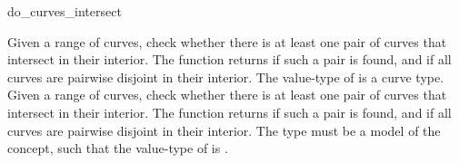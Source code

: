 \ccRefPageBegin

\begin{ccRefFunction}{do_curves_intersect}


{Given a range of curves, check whether there is at least one pair of curves
 that intersect in their interior. The function returns  if such
 a pair is found, and  if all curves are pairwise disjoint in
 their interior. The value-type of  is a curve type.}
\ccGlue
{}
{Given a range of curves, check whether there is at least one pair of curves
 that intersect in their interior. The function returns  if such
 a pair is found, and  if all curves are pairwise disjoint in
 their interior. The  type must be a model
 of the  concept, such that the value-type of
  is .}
 
\end{ccRefFunction}

\ccRefPageEnd
